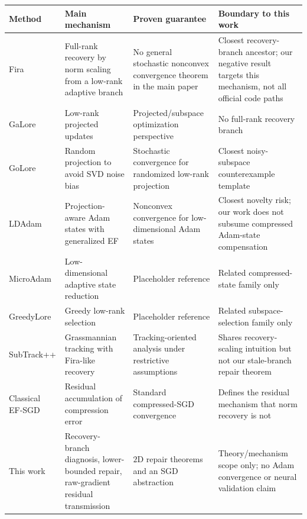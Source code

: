 \centering
\scriptsize
\begin{tabularx}{\linewidth}{p{1.8cm}p{2.8cm}p{2.6cm}X}
\toprule
Method & Main mechanism & Proven guarantee & Boundary to this work \\
\midrule
Fira & Full-rank recovery by norm scaling from a low-rank adaptive branch & No general stochastic nonconvex convergence theorem in the main paper & Closest recovery-branch ancestor; our negative result targets this mechanism, not all official code paths \\
GaLore & Low-rank projected updates & Projected/subspace optimization perspective & No full-rank recovery branch \\
GoLore & Random projection to avoid SVD noise bias & Stochastic convergence for randomized low-rank projection & Closest noisy-subspace counterexample template \\
LDAdam & Projection-aware Adam states with generalized EF & Nonconvex convergence for low-dimensional Adam states & Closest novelty risk; our work does not subsume compressed Adam-state compensation \\
MicroAdam & Low-dimensional adaptive state reduction & Placeholder reference & Related compressed-state family only \\
GreedyLore & Greedy low-rank selection & Placeholder reference & Related subspace-selection family only \\
SubTrack++ & Grassmannian tracking with Fira-like recovery & Tracking-oriented analysis under restrictive assumptions & Shares recovery-scaling intuition but not our stale-branch repair theorem \\
Classical EF-SGD & Residual accumulation of compression error & Standard compressed-SGD convergence & Defines the residual mechanism that norm recovery is not \\
This work & Recovery-branch diagnosis, lower-bounded repair, raw-gradient residual transmission & $2$D repair theorems and an SGD abstraction & Theory/mechanism scope only; no Adam convergence or neural validation claim \\
\bottomrule
\end{tabularx}
